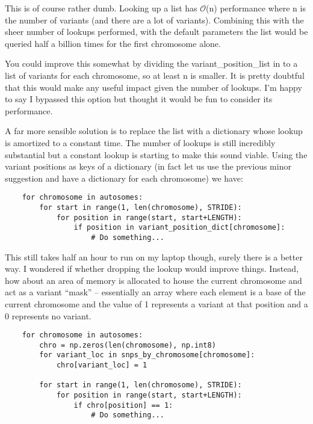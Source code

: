 This is of course rather dumb. Looking up a list has $\mathcal{O}$(n) performance
where n is the number of variants (and there are a lot of variants). Combining
this with the sheer number of lookups performed, with the default parameters the
list would be queried half a billion times for the first chromosome alone.

You could improve this somewhat by dividing the variant\_position\_list in to a
list of variants for each chromosome, so at least n is smaller. It is pretty
doubtful that this would make any useful impact given the number of lookups.
I’m happy to say I bypassed this option but thought it would be fun to consider
its performance.

A far more sensible solution is to replace the list with a dictionary
whose lookup is amortized to a constant time. The number of lookups is still
incredibly substantial but a constant lookup is starting to make this sound
viable. Using the variant positions as keys of a dictionary (in fact let us use
the previous minor suggestion and have a dictionary for each chromosome) we
have:

\begin{verbatim}
    for chromosome in autosomes:
        for start in range(1, len(chromosome), STRIDE):
            for position in range(start, start+LENGTH):
                if position in variant_position_dict[chromosome]:
                    # Do something...
\end{verbatim}

This still takes half an hour to run on my laptop though, surely there
is a better way.  I wondered if whether dropping the lookup would improve
things. Instead, how about an area of memory is allocated to house the current
chromosome and act as a variant “mask” -- essentially an array where each element
is a base of the current chromosome and the value of 1 represents a variant at
that position and a 0 represents no variant.

\begin{verbatim}
    for chromosome in autosomes:
        chro = np.zeros(len(chromosome), np.int8)
        for variant_loc in snps_by_chromosome[chromosome]:
            chro[variant_loc] = 1

        for start in range(1, len(chromosome), STRIDE):
            for position in range(start, start+LENGTH):
                if chro[position] == 1:
                    # Do something...
\end{verbatim}

